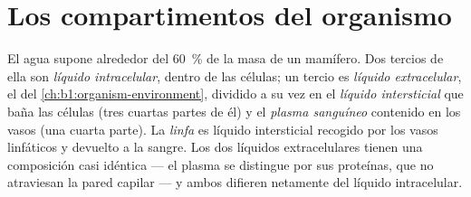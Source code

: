 \section{Los compartimentos del organismo}

\begin{definition}\label{def:b1:mammal-organization:compartments}
El agua supone alrededor del \qty{60}{\%} de la masa de un mamífero. Dos
tercios de ella son \emph{líquido intracelular}, dentro de las células; un tercio es \emph{líquido
extracelular}, el  del
\cref{ch:b1:organism-environment}, dividido a su vez en el \emph{líquido
intersticial} que baña las células (tres cuartas
partes de él) y el \emph{plasma sanguíneo} contenido en los
vasos (una cuarta parte). La \emph{linfa} es líquido
intersticial recogido por los vasos linfáticos y devuelto a la sangre. Los
dos líquidos extracelulares tienen una composición casi idéntica --- el
plasma se distingue por sus proteínas, que no atraviesan la pared capilar
--- y ambos difieren netamente del líquido intracelular.
\end{definition}

